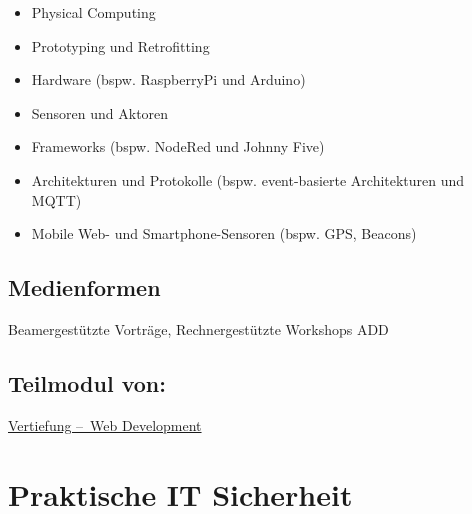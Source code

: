 \begin{itemize}
\tightlist
\item
  Physical Computing
\item
  Prototyping und Retrofitting
\item
  Hardware (bspw. RaspberryPi und Arduino)
\item
  Sensoren und Aktoren
\item
  Frameworks (bspw. NodeRed und Johnny Five)
\item
  Architekturen und Protokolle (bspw. event-basierte Architekturen und
  MQTT)
\item
  Mobile Web- und Smartphone-Sensoren (bspw. GPS, Beacons)
\end{itemize}

\hypertarget{medienformenpathlabelmi-2017modulbeschreibungen-bachelorba_wd_internet-of-things}{%
\section*{Medienformen\label{/mi-2017/modulbeschreibungen-bachelor/BA_WD_Internet-of-things}}\label{medienformenpathlabelmi-2017modulbeschreibungen-bachelorba_wd_internet-of-things}}

Beamergestützte Vorträge, Rechnergestützte Workshops ADD

\hypertarget{teilmodul-vonpathlabelmi-2017modulbeschreibungen-bachelorba_wd_internet-of-things}{%
\section*{Teilmodul
von:\label{/mi-2017/modulbeschreibungen-bachelor/BA_WD_Internet-of-things}}\label{teilmodul-vonpathlabelmi-2017modulbeschreibungen-bachelorba_wd_internet-of-things}}

\hyperref[/mi-2017/modulbeschreibungen-bachelor/BA_Vertiefung-Web_Development]{Vertiefung – Web Development}

\hypertarget{praktische-it-sicherheitpathlabelmi-2017modulbeschreibungen-bachelorba_wd_praktische-it-sicherheit}{%
\chapter{Praktische IT
Sicherheit\label{/mi-2017/modulbeschreibungen-bachelor/BA_WD_Praktische-IT-Sicherheit}}\label{praktische-it-sicherheitpathlabelmi-2017modulbeschreibungen-bachelorba_wd_praktische-it-sicherheit}}

